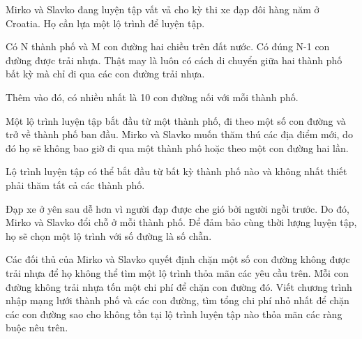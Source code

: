 Mirko và Slavko đang luyện tập vất vả cho kỳ thi xe đạp đôi hàng năm ở Croatia. Họ cần lựa một lộ trình để luyện tập.  

   Có N thành phố và M con đường hai chiều trên đất nước. Có đúng N-1 con đường được trải nhựa. Thật may là luôn có cách di chuyển giữa hai thành phố bất kỳ mà chỉ đi qua các con đường trải nhựa.  

   Thêm vào đó, có nhiều nhất là 10 con đường nối với mỗi thành phố.  

   Một lộ trình luyện tập bắt đầu từ một thành phố, đi theo một số con đường và trở về thành phố ban đầu. Mirko và Slavko muốn thăm thú các địa điểm mới, do đó họ sẽ không bao giờ đi qua một thành phố hoặc theo một con đường hai lần.  

   Lộ trình luyện tập có thể bắt đầu từ bất kỳ thành phố nào và không nhất thiết phải thăm tất cả các thành phố.  

   Đạp xe ở yên sau dễ hơn vì người đạp được che gió bởi người ngồi trước. Do đó, Mirko và Slavko đổi chỗ ở mỗi thành phố. Để đảm bảo cùng thời lượng luyện tập, họ sẽ chọn một lộ trình với số đường là số chẵn.  

   Các đối thủ của Mirko và Slavko quyết định chặn một số con đường không được trải nhựa để họ không thể tìm một lộ trình thỏa mãn các yêu cầu trên. Mỗi con đường không trải nhựa tốn một chi phí để chặn con đường đó.
Viết chương trình nhập mạng lưới thành phố và các con đường, tìm tổng chi phí nhỏ nhất để chặn các con đường sao cho không tồn tại lộ trình luyện tập nào thỏa mãn các ràng buộc nêu trên.